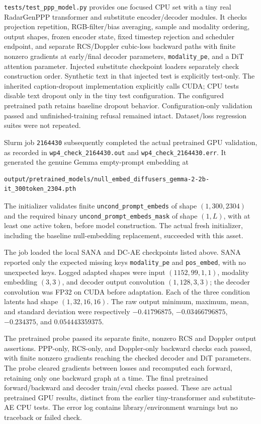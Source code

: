 \documentclass[11pt,a4paper]{article}
\begin{document}
\texttt{tests/test\_ppp\_model.py} provides one focused CPU set with a tiny
real RadarGenPPP transformer and substitute encoder/decoder modules.
It checks projection repetition, RGB-filter/bias averaging, sample and
modality ordering, output shapes, frozen encoder state, fixed timestep
rejection and scheduler endpoint, and separate RCS/Doppler cubic-loss
backward paths with finite nonzero gradients at early/final decoder
parameters, \texttt{modality\_pe}, and a DiT attention parameter.
Injected substitute checkpoint loaders separately check construction order.
Synthetic text in that injected test is explicitly test-only.
The inherited caption-dropout implementation explicitly calls CUDA;
CPU tests disable text dropout only in the tiny test configuration.
The configured pretrained path retains baseline dropout behavior.
Configuration-only validation passed and unfinished-training refusal
remained intact. Dataset/loss regression suites were not repeated.

Slurm job \texttt{2164430} subsequently completed the actual pretrained
GPU validation, as recorded in \texttt{wp4\_check\_2164430.out} and
\texttt{wp4\_check\_2164430.err}. It generated the genuine Gemma
empty-prompt embedding at
\begin{lstlisting}
output/pretrained_models/null_embed_diffusers_gemma-2-2b-it_300token_2304.pth
\end{lstlisting}
The initializer validates finite \texttt{uncond\_prompt\_embeds} of shape
\((1,300,2304)\) and the required binary
\texttt{uncond\_prompt\_embeds\_mask} of shape \((1,L)\), with at least
one active token, before model construction. The actual fresh initializer,
including the baseline null-embedding replacement, succeeded with this asset.

The job loaded the local SANA and DC-AE checkpoints listed above.
SANA reported only the expected missing keys \texttt{modality\_pe} and
\texttt{pos\_embed}, with no unexpected keys. Logged adapted shapes were
input \((1152,99,1,1)\), modality embedding \((3,3)\), and decoder output
convolution \((1,128,3,3)\); the decoder convolution was FP32 on CUDA
before adaptation. Each of the three condition latents had shape
\((1,32,16,16)\). The raw output minimum, maximum, mean, and standard
deviation were respectively \(-0.41796875\), \(-0.03466796875\),
\(-0.234375\), and \(0.054443359375\).

The pretrained probe passed its separate finite, nonzero RCS and Doppler
output assertions. PPP-only, RCS-only, and Doppler-only backward checks
each passed, with finite nonzero gradients reaching the checked decoder
and DiT parameters. The probe cleared gradients between losses and
recomputed each forward, retaining only one backward graph at a time.
The final pretrained forward/backward and decoder train/eval checks
passed. These are actual pretrained GPU results, distinct from the earlier
tiny-transformer and substitute-AE CPU tests. The error log contains
library/environment warnings but no traceback or failed check.
\end{document}
